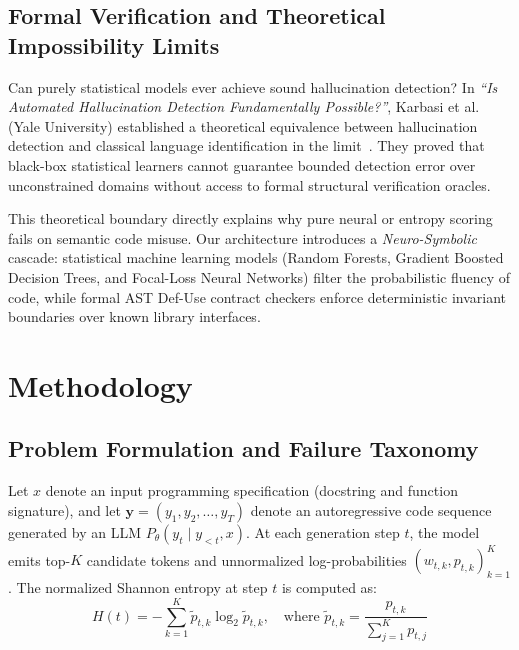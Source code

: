 \subsection{Formal Verification and Theoretical Impossibility Limits}
Can purely statistical models ever achieve sound hallucination detection? In \emph{``Is Automated Hallucination Detection Fundamentally Possible?''}, Karbasi et al.~\cite{karbasi2025impossibility} (Yale University) established a theoretical equivalence between hallucination detection and classical language identification in the limit~\cite{gold1967language,angluin1980inductive}. They proved that black-box statistical learners cannot guarantee bounded detection error over unconstrained domains without access to formal structural verification oracles.

This theoretical boundary directly explains why pure neural or entropy scoring fails on semantic code misuse. Our architecture introduces a \emph{Neuro-Symbolic} cascade: statistical machine learning models (Random Forests, Gradient Boosted Decision Trees, and Focal-Loss Neural Networks) filter the probabilistic fluency of code, while formal AST Def-Use contract checkers enforce deterministic invariant boundaries over known library interfaces.


\section{Methodology}
\label{sec:methodology}

\subsection{Problem Formulation and Failure Taxonomy}
Let $x$ denote an input programming specification (docstring and function signature), and let $\mathbf{y} = (y_1, y_2, \dots, y_T)$ denote an autoregressive code sequence generated by an LLM $P_\theta(y_t \mid y_{<t}, x)$. At each generation step $t$, the model emits top-$K$ candidate tokens and unnormalized log-probabilities $(w_{t,k}, p_{t,k})_{k=1}^K$. The normalized Shannon entropy at step $t$ is computed as:
\begin{equation}
    H(t) = - \sum_{k=1}^K \tilde{p}_{t,k} \log_2 \tilde{p}_{t,k}, \quad \text{where } \tilde{p}_{t,k} = \frac{p_{t,k}}{\sum_{j=1}^K p_{t,j}}
\end{equation}

